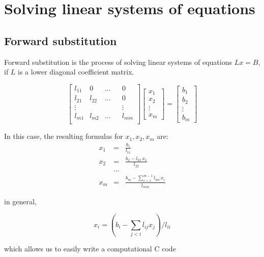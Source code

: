 \section{Solving linear systems of equations}

\subsection{Forward substitution}

Forward substitution is the process of solving linear systems of equations $Lx=B$, if $L$ is a lower diagonal coefficient matrix.

$$
\begin{bmatrix}
l_{11} & 0 & \ldots && 0\\
l_{21} & l_{22} & \ldots && 0\\
\vdots & & & & \vdots \\
l_{m1} & l_{m2} & \ldots && l_{mm}\\
\end{bmatrix}
\begin{bmatrix}
x_{1} \\
x_{2} \\
\vdots   \\
x_{m}
\end{bmatrix}
=
\begin{bmatrix}
b_{1} \\
b_{2} \\
\vdots \\
b_{m}
\end{bmatrix}
$$

In this case, the resulting formulas for $x_1, x_2, x_m$ are:
$$
\begin{array}{rcl}
x_{1} & = & \displaystyle \frac{b_{1}}{l_{11}} \\[4mm]
x_{2} & = & \displaystyle \frac{b_{2}-l_{21}\,x_{1}}{l_{22}} \\[2mm]
& ...&  \\
x_{m} & = & \displaystyle \frac{\displaystyle b_{m} - \sum_{i=1}^{m-1} l_{mi}\,x_{i}}{l_{mm}}
\end{array}
$$

in general,

$$
x_i = \left( b_i - \sum_{j<i} l_{ij}x_j \right) / l_{ii}
$$

which allows us to easily write a computational C code

